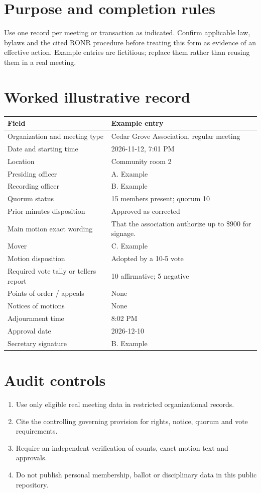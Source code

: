 \documentclass[11pt]{article}
\begin{document}
\SuiteOpen
\section{Purpose and completion rules}
Use one record per meeting or transaction as indicated. Confirm applicable law, bylaws and the cited RONR procedure before treating this form as evidence of an effective action. Example entries are fictitious; replace them rather than reusing them in a real meeting.

\section{Worked illustrative record}
\begin{longtable}{@{}p{.38\linewidth}p{.55\linewidth}@{}}\toprule Field & Example entry\\\midrule\endhead


Organization and meeting type & Cedar Grove Association, regular meeting\\
Date and starting time & 2026-11-12, 7:01 PM\\
Location & Community room 2\\
Presiding officer & A. Example\\
Recording officer & B. Example\\
Quorum status & 15 members present; quorum 10\\
Prior minutes disposition & Approved as corrected\\
Main motion exact wording & That the association authorize up to \$900 for signage.\\
Mover & C. Example\\
Motion disposition & Adopted by a 10-5 vote\\
Required vote tally or tellers report & 10 affirmative; 5 negative\\
Points of order / appeals & None\\
Notices of motions & None\\
Adjournment time & 8:02 PM\\
Approval date & 2026-12-10\\
Secretary signature & B. Example\\
\bottomrule\end{longtable}
\section{Audit controls}
\begin{enumerate}[leftmargin=*,itemsep=4pt]
\item Use only eligible real meeting data in restricted organizational records.
\item Cite the controlling governing provision for rights, notice, quorum and vote requirements.
\item Require an independent verification of counts, exact motion text and approvals.
\item Do not publish personal membership, ballot or disciplinary data in this public repository.
\end{enumerate}
\end{document}
